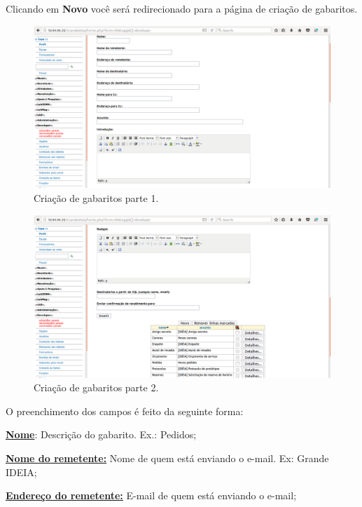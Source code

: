 \documentclass[9pt]{report}
\begin{document}
{      Clicando em \textbf{Novo} você será redirecionado para a página
      de criação de gabaritos.

      \begin{figure}[H]
        \includegraphics[width=\textwidth]{2_Formularios/6_Envio_de_email/58.png}
        \caption{Criação de gabaritos parte 1.}
        \label{fig:novogabaritosemail1}
      \end{figure}

      \begin{figure}[H]
        \includegraphics[width=\textwidth]{2_Formularios/6_Envio_de_email/59.png}
        \caption{Criação de gabaritos parte 2.}
        \label{fig:novogabaritosemail2}
      \end{figure}

      O preenchimento dos campos é feito da seguinte forma:
      
      \underline{\textbf{Nome}}: Descrição do gabarito. Ex.: Pedidos;
      
      \underline{\textbf{Nome do remetente:}} Nome de quem está
      enviando o e-mail.
      Ex: Grande IDEIA;
      
      \underline{\textbf{Endereço do remetente:}} E-mail de quem
      está enviando o e-mail;
      
}
\end{document}

